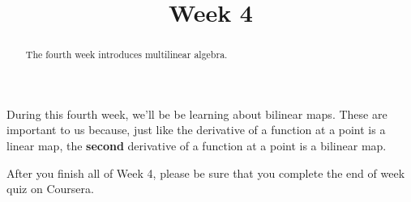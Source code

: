 \documentclass{ximera}
\title{Week 4}
\begin{document}
\begin{abstract}
  The fourth week introduces multilinear algebra.
\end{abstract}

During this fourth week, we'll be be learning about bilinear maps.  These are important to us because, just like the derivative
of a function at a point is a linear map, the \textbf{second} derivative of a function at a point is a bilinear map.

After you finish all of Week 4, please be sure that you complete the
end of week quiz on Coursera.
\end{document}
